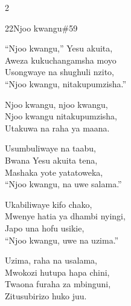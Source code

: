 \begin{multicols}{2}
\begin{hymn}{22}{Njoo kwangu}{\#59}
\begin{stanza}
``Njoo kwangu,'' Yesu akuita,\\
Aweza kukuchangamsha moyo\\
Usongwaye na shughuli nzito,\\
``Njoo kwangu, nitakupumzisha.''
\end{stanza}
\begin{chorus}
Njoo kwangu, njoo kwangu,\\
Njoo kwangu nitakupumzisha,\\
Utakuwa na raha ya maana.
\end{chorus}
\begin{stanza}
Usumbuliwaye na taabu,\\
Bwana Yesu akuita tena,\\
Mashaka yote yatatoweka,\\
``Njoo kwangu, na uwe salama.''
\end{stanza}
\begin{stanza}
Ukabiliwaye kifo chako,\\
Mwenye hatia ya dhambi nyingi,\\
Japo una hofu usikie,\\
``Njoo kwangu, uwe na uzima.''
\end{stanza}
\begin{stanza}
Uzima, raha na usalama,\\
Mwokozi hutupa hapa chini,\\
Twaona furaha za mbinguni,\\
Zitusubirizo huko juu.
\end{stanza}
\end{hymn}


\end{multicols}
